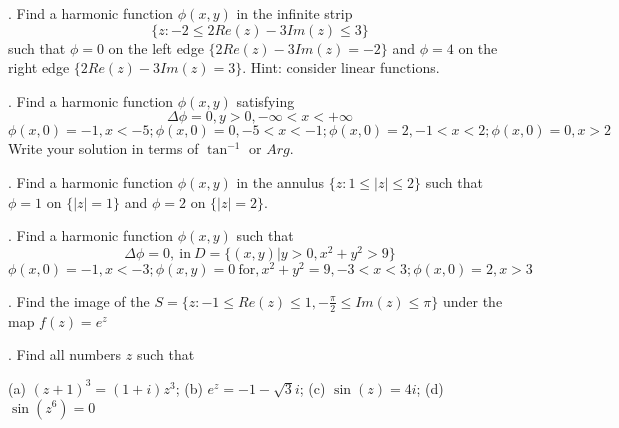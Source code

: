 . Find a harmonic function $\phi (x,y)$ in the infinite strip
$$ \{ z: -2 \leq 2Re (z) -3 Im (z)  \leq 3\}$$
such that $ \phi =0$ on the left edge  $\{ 2 Re (z)- 3 Im (z)=-2\}$ and $\phi= 4$ on the right edge $ \{ 2Re (z)- 3 Im (z)=3\}$.  Hint: consider linear functions.

\medskip

. Find a harmonic function $\phi (x, y)$ satisfying
$$ \Delta \phi=0, y>0, -\infty <x<+\infty $$
$$ \phi (x,0)=-1, x<-5; \phi (x, 0)=0, -5<x<-1; \phi (x,0)=2, -1<x<2; \phi (x,0)=0, x>2 $$
Write your solution in terms of $ \tan^{-1}$ or $Arg$.

\medskip

. Find a harmonic function $\phi (x, y)$ in the annulus $ \{ z: 1\leq |z| \leq 2 \}$ such that $\phi=1$ on $ \{ |z|=1\}$ and $\phi=2$ on $ \{|z|=2\}$.


\medskip


. Find a harmonic function $\phi (x,y)$ such that
$$ \Delta \phi=0, \ \mbox{in} \ D= \{ (x,y) | y>0, x^2+y^2>9 \} $$
$$ \phi (x,0)=-1, x<-3; \phi (x,y)=0 \ \mbox{for}, x^2+y^2=9, -3<x<3; \phi (x,0)=2, x>3 $$

\medskip




. Find the image of the $S= \{ z: -1\leq Re (z) \leq 1, -\frac{\pi}{2} \leq Im (z) \leq \pi \}$ under the map $ f(z)= e^z$


\medskip


. Find all numbers $z$ such that

(a) $(z+1)^3=(1+i)z^3$; (b) $ e^z= -1-\sqrt{3} i$; (c) $ \sin (z)= 4i$; (d) $ \sin ( z^6)=0$














